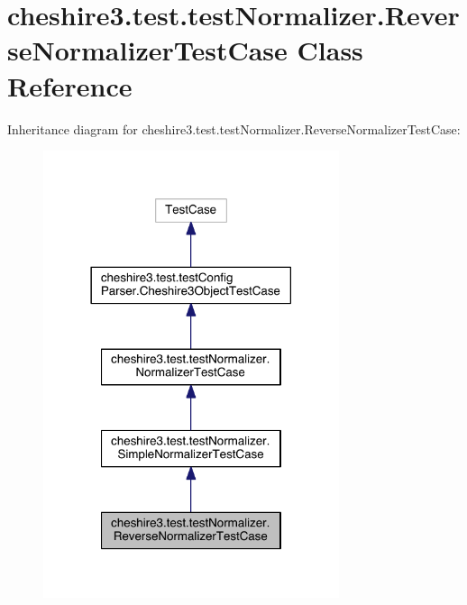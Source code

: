 \hypertarget{classcheshire3_1_1test_1_1test_normalizer_1_1_reverse_normalizer_test_case}{\section{cheshire3.\-test.\-test\-Normalizer.\-Reverse\-Normalizer\-Test\-Case Class Reference}
\label{classcheshire3_1_1test_1_1test_normalizer_1_1_reverse_normalizer_test_case}
}


Inheritance diagram for cheshire3.\-test.\-test\-Normalizer.\-Reverse\-Normalizer\-Test\-Case\-:
\nopagebreak
\begin{figure}[H]
\begin{center}
\leavevmode
\includegraphics[width=246pt]{classcheshire3_1_1test_1_1test_normalizer_1_1_reverse_normalizer_test_case__inherit__graph}
\end{center}
\end{figure}


